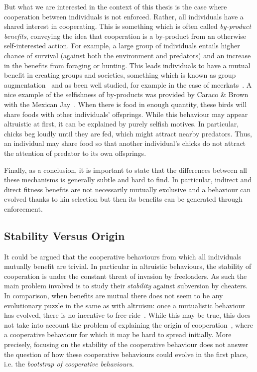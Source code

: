     But what we are interested in the context of this thesis is the case where cooperation between individuals is not enforced. Rather, all individuals have a shared interest in cooperating. This is something which is often called \emph{by-product benefits}, conveying the idea that cooperation is a by-product from an otherwise self-interested action. For example, a large group of individuals entails higher chance of survival (against both the environment and predators) and an increase in the benefits from foraging or hunting. This leads individuals to have a mutual benefit in creating groups and societies, something which is known as group augmentation~\parencite{Bergmuller2007a} and as been well studied, for example in the case of meerkats~\parencite{Clutton-Brock2002}. A nice example of the selfishness of by-products was provided by Caraco \& Brown with the Mexican Jay~\parencite{Caraco1986, Dugatkin2002}. When there is food in enough quantity, these birds will share foods with other individuals' offsprings. While this behaviour may appear altruistic at first, it can be explained by purely selfish motives. In particular, chicks beg loudly until they are fed, which might attract nearby predators. Thus, an individual may share food so that another individual's chicks do not attract the attention of predator to its own offsprings.

    Finally, as a conclusion, it is important to state that the differences between all these mechanisms is generally subtle and hard to find. In particular, indirect and direct fitness benefits are not necessarily mutually exclusive and a behaviour can evolved thanks to kin selection but then its benefits can be generated through enforcement.


  \subsection{Stability Versus Origin}

    It could be argued that the cooperative behaviours from which all individuals mutually benefit are trivial. In particular in altruistic behaviours, the stability of cooperation is under the constant threat of invasion by freeloaders. As such the main problem involved is to study their \emph{stability} against subversion by cheaters. In comparison, when benefits are mutual there does not seem to be any evolutionary puzzle in the same as with altruism: once a mutualistic behaviour has evolved, there is no incentive to free-ride~\parencite{Forber2015}. While this may be true, this does not take into account the problem of explaining the origin of cooperation~\parencite{West2007}, where a cooperative behaviour for which it may be hard to spread initially. More precisely, focusing on the stability of the cooperative behaviour does not answer the question of how these cooperative behaviours could evolve in the first place, i.e. the \emph{bootstrap of cooperative behaviours}.

